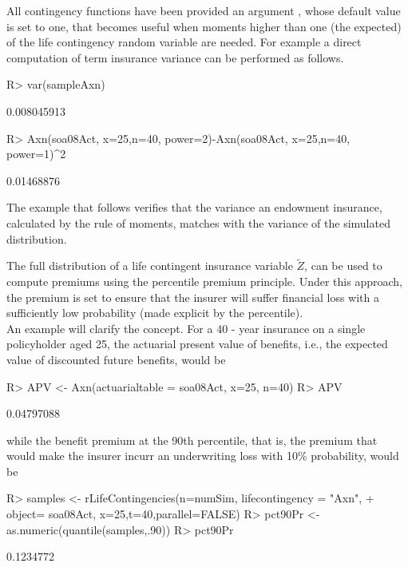 \documentclass[nojss]{jss}
\begin{document}
All contingency functions have been provided an argument , whose
default value is set to one, that becomes useful when moments higher than one
(the expected) of the life contingency random variable are needed. For example a
direct computation of term insurance variance can be performed as follows.

\begin{Schunk}
\begin{Sinput}
R> var(sampleAxn)
\end{Sinput}
\begin{Soutput}
[1] 0.008045913
\end{Soutput}
\begin{Sinput}
R> Axn(soa08Act, x=25,n=40, power=2)-Axn(soa08Act, x=25,n=40, power=1)^2
\end{Sinput}
\begin{Soutput}
[1] 0.01468876
\end{Soutput}
\end{Schunk}

The example that follows verifies that the variance an endowment insurance, 
calculated by the rule of moments, matches with the variance of the simulated
distribution.


The full distribution of a life contingent insurance variable $\tilde Z$, can be
used to compute premiums using the percentile premium principle. Under this
approach, the premium is set to ensure that the insurer will suffer financial loss
with a sufficiently low probability (made explicit by the percentile).\\
An example will clarify the concept. For a 40 - year
insurance on a single policyholder aged 25, the actuarial present value of benefits, 
i.e., the expected value of discounted future benefits, would be

\begin{Schunk}
\begin{Sinput}
R> APV <- Axn(actuarialtable = soa08Act, x=25, n=40)
R> APV
\end{Sinput}
\begin{Soutput}
[1] 0.04797088
\end{Soutput}
\end{Schunk}

while the benefit premium at the 90th percentile, that is, the premium that would
make the insurer incurr an underwriting loss with 10\% probability,
would be




\begin{Schunk}
\begin{Sinput}
R> samples <- rLifeContingencies(n=numSim, lifecontingency = "Axn", 
+  		object= soa08Act, x=25,t=40,parallel=FALSE)
R> pct90Pr <- as.numeric(quantile(samples,.90))
R> pct90Pr
\end{Sinput}
\begin{Soutput}
[1] 0.1234772
\end{Soutput}
\end{Schunk}
\end{document}
